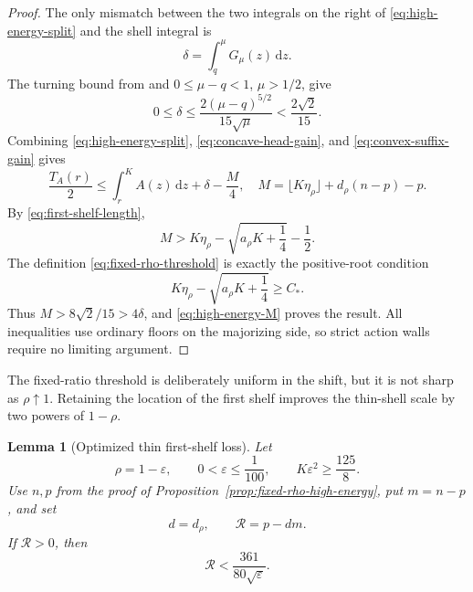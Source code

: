 \documentclass[11pt]{article}
\newtheorem{lemma}[theorem]{Lemma}
\theoremstyle{remark}
\newcommand{\dd}{\,\mathrm d}
\begin{document}
\begin{proof}
The only mismatch between the two integrals on the right of
\eqref{eq:high-energy-split} and the shell integral is
\[
 \delta=\int_q^\mu G_\mu(z)\dd z.
\]
The turning bound from \cite[Lemma~6.2]{FLPSannuli} and
$0\leq\mu-q<1$, $\mu>1/2$, give
\begin{equation}
 0\leq\delta\leq
 \frac{2(\mu-q)^{5/2}}{15\sqrt\mu}
 <\frac{2\sqrt2}{15}.
 \label{eq:interface-mismatch-high-energy}
\end{equation}
Combining \eqref{eq:high-energy-split},
\eqref{eq:concave-head-gain}, and
\eqref{eq:convex-suffix-gain} gives
\begin{equation}
 \frac{T_A(r)}2\leq\int_r^K A(z)\dd z+\delta-\frac M4,
 \quad
 M=\lfloor K\eta_\rho\rfloor+d_\rho(n-p)-p.
 \label{eq:high-energy-M}
\end{equation}
By \eqref{eq:first-shelf-length},
\[
 M>K\eta_\rho-\sqrt{a_\rho K+\frac14}-\frac12.
\]
The definition \eqref{eq:fixed-rho-threshold} is exactly the positive-root
condition
\[
 K\eta_\rho-\sqrt{a_\rho K+\frac14}\geq C_*.
\]
Thus $M>8\sqrt2/15>4\delta$, and
\eqref{eq:high-energy-M} proves the result.  All inequalities use
ordinary floors on the majorizing side, so strict action walls require no
limiting argument.
\end{proof}

The fixed-ratio threshold is deliberately uniform in the shift, but it is
not sharp as $\rho\uparrow1$.  Retaining the location of the first shelf
improves the thin-shell scale by two powers of $1-\rho$.

\begin{lemma}[Optimized thin first-shelf loss]
\label{lem:thin-first-shelf-loss}
Let
\[
 \rho=1-\varepsilon,
 \qquad 0<\varepsilon\leq\frac1{100},
 \qquad K\varepsilon^2\geq\frac{125}{8}.
\]
Use $n,p$ from the proof of
Proposition~\ref{prop:fixed-rho-high-energy}, put $m=n-p$, and set
\[
 d=d_\rho,
 \qquad \mathcal R=p-dm.
\]
If $\mathcal R>0$, then
\begin{equation}
 \mathcal R<\frac{361}{80\sqrt\varepsilon}.
 \label{eq:thin-shelf-loss}
\end{equation}
\end{lemma}
\end{document}
